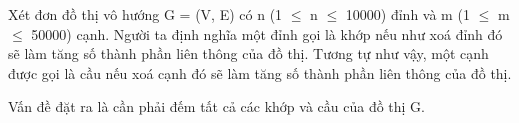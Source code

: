 Xét đơn đồ thị vô hướng G = (V, E) có n (1  $\le$  n  $\le$  10000) đỉnh và m (1  $\le$  m  $\le$  50000) cạnh. Người ta định nghĩa một đỉnh gọi là khớp nếu như xoá đỉnh đó sẽ làm tăng số thành phần liên thông của đồ thị. Tương tự như vậy, một cạnh được gọi là cầu nếu xoá cạnh đó sẽ làm tăng số thành phần liên thông của đồ thị.

Vấn đề đặt ra là cần phải đếm tất cả các khớp và cầu của đồ thị G.